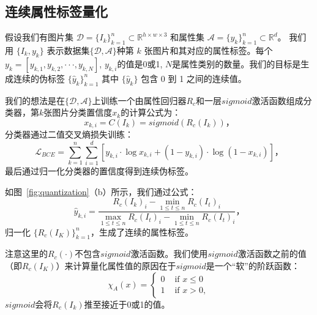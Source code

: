 \subsection{连续属性标签量化}
假设我们有图片集 $\mathcal{D} = \{I_k\}_{k=1}^n \subset \mathbb{R}^{h \times w \times 3}$ 和属性集 $\mathcal{A} = \{y_k\}_{k=1}^n \subset \mathbb{R}^{d}$。 我们用 $\{I_k, y_k\}$ 表示数据集$\{\mathcal{D}, \mathcal{A}\}$种第 $k$ 张图片和其对应的属性标签。每个$y_k=[y_{k,1}, y_{k,2}, \cdot \cdot \cdot ,y_{k,N}]$, $y_{k,i}$的值是0或1, $N$是属性类别的数量。我们的目标是生成连续的伪标签 $\{\hat{y}_k\}_{k=1}^n$ 其中 $\{\hat{y}_k\}$ 包含 0 到 1 之间的连续值。

我们的想法是在$\{\mathcal{D}, \mathcal{A}\}$上训练一个由属性回归器$R_c$和一层$sigmoid$激活函数组成分类器，第$k$张图片分类置信度$x_{k}$的计算公式为：
\begin{equation}
     x_{k,i} = C(I_k) = sigmoid(R_c(I_k))，
\end{equation}
分类器通过二值交叉熵损失训练：
\begin{equation}
     \mathcal{L}_{BCE} = \sum_{k=1}^n \sum_{i=1}^d [y_{k,i} \cdot \log x_{k,i}+\left(1-y_{k,i}\right) \cdot \log \left(1-x_{k,i}\right)]，
\end{equation}
最后通过归一化分类器的置信度得到连续伪标签。

如图~\ref{fig:quantization}（b）所示，我们通过公式：
\begin{equation}
     \hat{y}_{k,i} = \frac{R_c(I_k)_i - \min \limits_{1 \leq t \leq n}R_c(I_t)_i}{\max \limits_{1 \leq t \leq n}R_c(I_t)_i - \min \limits_{1 \leq t \leq n}R_c(I_t)_i}，
     \label{eq3}
\end{equation}
归一化 $\{R_c(I_K)\}_{k=1}^n$，生成了连续的属性标签。

注意这里的$R_c(\cdot)$不包含$sigmoid$激活函数。我们使用$sigmoid$激活函数之前的值（即$R_c(I_K)$）来计算量化属性值的原因在于$sigmoid$是一个“软”的阶跃函数：
\begin{equation}
   \chi_{A}(x)=\left\{\begin{array}{ll}
      0 & \text { if } x \leq 0 \\
      1 & \text { if } x > 0,
      \end{array}\right.
\end{equation}
$sigmoid$会将$R_c(I_k)$推至接近于0或1的值。

